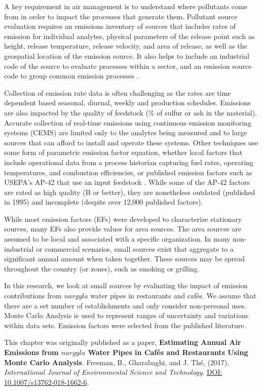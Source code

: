 A key requirement in air management is to understand where pollutants come from in order to impact the processes that generate them. Pollutant source evaluation requires an emissions inventory of sources that includes rates of emission for individual analytes, physical parameters of the release point such as height, release temperature, release velocity, and area of release, as well as the geospatial location of the emission source. It also helps to include an industrial code of the source to evaluate processes within a sector, and an emission source code to group common emission processes \citep{The2008}.

Collection of emission rate data is often challenging as the rates are time dependent based seasonal, diurnal, weekly and production schedules. Emissions are also impacted by the quality of feedstock (\% of sulfur or ash in the material). Accurate collection of real-time emissions using continuous emission monitoring systems (CEMS) are limited only to the analytes being measured and to large sources that can afford to install and operate these systems. Other techniques use some form of parametric emission factor equation, whether local factors that include operational data from a process historian capturing fuel rates, operating temperatures, and combustion efficiencies, or published emission factors such as USEPA's AP-42 that use an input feedstock \citep{USEPA1995}. While some of the AP-42 factors are rated as high quality (B or better), they are nonetheless outdated (published in 1995) and incomplete (despite over 12,000 published factors).

While most emission factors (EFs) were developed to characterize stationary sources, many EFs also provide values for area sources. The area sources are assumed to be local and associated with a specific organization. In many non-industrial or commercial scenarios, small sources exist that aggregate to a significant annual amount when taken together.  These sources may be spread throughout the country (or zones), such as smoking or grilling.

In this research, we look at small sources by evaluating the impact of emission contributions from $nargyla$ water pipes in restaurants and caf\'es. We assume that there are a set number of establishments and only consider non-personal uses.  Monte Carlo Analysis is used to represent ranges of uncertainty and variations within data sets. Emission factors were selected from the published literature.

This chapter was originally published as a paper,  \textbf{Estimating Annual Air Emissions from $nargyla$ Water Pipes in Caf\'es and Restaurants Using Monte Carlo Analysis}. Freeman, B., Gharabaghi, and J.  Th\'e, (2017). \textit{International Journal of Environmental Science and Technology}. \url{DOI: 10.1007/s13762-018-1662-6}.

